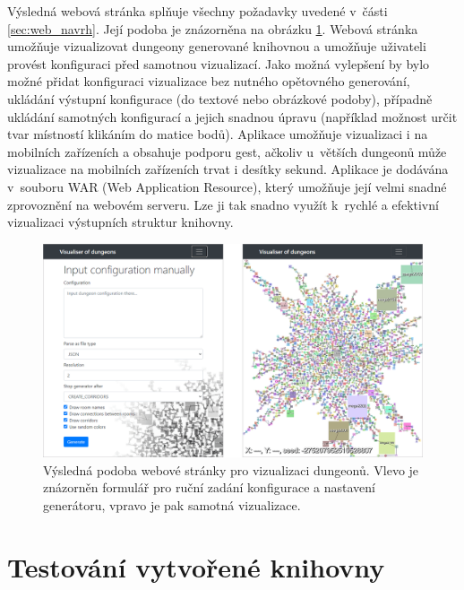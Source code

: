 Výsledná webová stránka splňuje všechny požadavky uvedené v~části \ref{sec:web_navrh}.
Její podoba je znázorněna na obrázku \ref{img:web-final}.
Webová stránka umožňuje vizualizovat dungeony generované knihovnou a umožňuje uživateli provést konfiguraci před samotnou vizualizací.
Jako možná vylepšení by bylo možné přidat konfiguraci vizualizace bez nutného opětovného generování, ukládání výstupní konfigurace (do textové nebo obrázkové podoby), případně ukládání samotných konfigurací a jejich snadnou úpravu (například možnost určit tvar místností klikáním do matice bodů).
Aplikace umožňuje vizualizaci i na mobilních zařízeních a obsahuje podporu gest, ačkoliv u~větších dungeonů může vizualizace na mobilních zařízeních trvat i desítky sekund.
Aplikace je dodávána v~souboru WAR (Web Application Resource), který umožňuje její velmi snadné zprovoznění na webovém serveru.
Lze ji tak snadno využít k~rychlé a efektivní vizualizaci výstupních struktur knihovny.
\begin{figure}[ht]
    \centering
    \includegraphics[width=1.00\textwidth]{obrazky/web_final.png}
    \caption{Výsledná podoba webové stránky pro vizualizaci dungeonů. Vlevo je znázorněn formulář pro ruční zadání konfigurace a nastavení generátoru, vpravo je pak samotná vizualizace.}
    \label{img:web-final}
\end{figure}




\chapter{Testování vytvořené knihovny}
\label{ch:testovani} %

